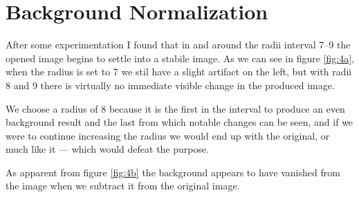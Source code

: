 %
%

\section{Background Normalization}
After some experimentation I found that in and around the radii interval 7--9
the opened image begins to settle into a stabile image. As we can see in
figure \ref{fig:4a}, when the radius is set to 7 we stil have a slight
artifact on the left, but with radii 8 and 9 there is virtually no immediate
visible change in the produced image.


We choose a radius of 8 because it is the first in the interval to produce an
even background result and the last from which notable changes can be seen,
and if we were to continue increasing the radius we would end up with the
original, or much like it --- which would defeat the purpose.


As apparent from figure \ref{fig:4b} the background appears to have vanished
from the image when we subtract it from the original image.
